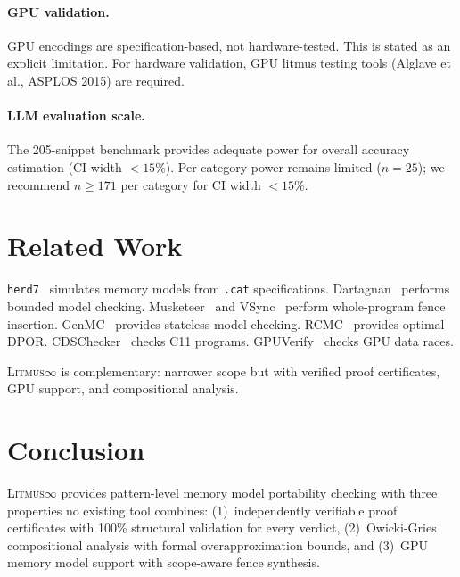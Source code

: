 \documentclass[11pt]{article}
\newcommand{\litmus}{\textsc{Litmus$\infty$}}
\begin{document}
\paragraph{GPU validation.}
GPU encodings are specification-based, not hardware-tested.
This is stated as an explicit limitation. For hardware validation,
GPU litmus testing tools (Alglave et al., ASPLOS 2015) are required.

\paragraph{LLM evaluation scale.}
The 205-snippet benchmark provides adequate power for overall
accuracy estimation (CI width $<15\%$). Per-category power
remains limited ($n=25$); we recommend $n \geq 171$ per category
for CI width $<15\%$.

\section{Related Work}
\label{sec:related}

\texttt{herd7}~\cite{Alglave2014} simulates memory models from
\texttt{.cat} specifications.
Dartagnan~\cite{Gavrilenko2019} performs bounded model checking.
Musketeer~\cite{Alglave2014Musketeer} and VSync~\cite{Oberhauser2021}
perform whole-program fence insertion.
GenMC~\cite{Kokologiannakis2019} provides stateless model checking.
RCMC~\cite{Kokologiannakis2018} provides optimal DPOR.
CDSChecker~\cite{Norris2013} checks C11 programs.
GPUVerify~\cite{Betts2012} checks GPU data races.

\litmus{} is complementary: narrower scope but with verified
proof certificates, GPU support, and compositional analysis.

\section{Conclusion}
\label{sec:conclusion}

\litmus{} provides pattern-level memory model portability checking
with three properties no existing tool combines: (1)~independently
verifiable proof certificates with 100\% structural validation
for every verdict, (2)~Owicki-Gries compositional analysis with
formal overapproximation bounds, and (3)~GPU memory model support
with scope-aware fence synthesis.
\end{document}
